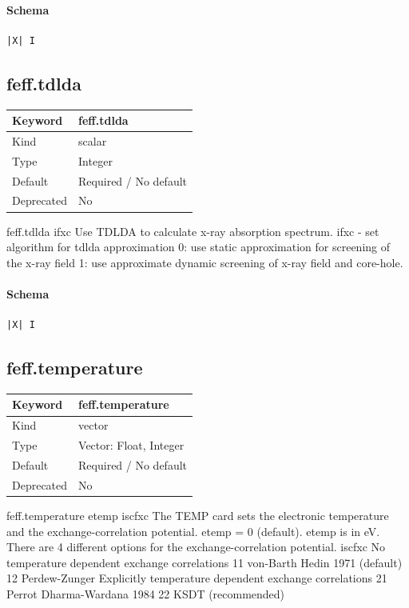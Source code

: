 \documentclass[11pt]{article}
\begin{document}
{{{{\paragraph{Schema}
\begin{Verbatim}
|X| I
\end{Verbatim}

\subsection{feff.tdlda}
\label{kw:feff-tdlda}
\begin{longtable}{|p{1.5in}|p{4.5in}|}
\hline
Keyword & feff.tdlda \\
\hline
Kind & scalar \\
\hline
Type & Integer \\
\hline
Default & Required / No default \\
\hline
Deprecated & No \\
\hline
\end{longtable}
 feff.tdlda{ ifxc }
 Use TDLDA to calculate x-ray absorption spectrum.
 ifxc - set algorithm for tdlda approximation
        0: use static approximation for screening of the x-ray field
        1: use approximate dynamic screening of x-ray field and core-hole.

\paragraph{Schema}
\begin{Verbatim}
|X| I
\end{Verbatim}

\subsection{feff.temperature}
\label{kw:feff-temperature}
\begin{longtable}{|p{1.5in}|p{4.5in}|}
\hline
Keyword & feff.temperature \\
\hline
Kind & vector \\
\hline
Type & Vector: Float, Integer \\
\hline
Default & Required / No default \\
\hline
Deprecated & No \\
\hline
\end{longtable}
 feff.temperature{ etemp iscfxc }
 The TEMP card sets the electronic temperature and the exchange-correlation potential. etemp
 = 0 (default). etemp is in eV. There are 4 different options for the exchange-correlation
 potential.
 iscfxc
    No temperature dependent exchange correlations
       11 von-Barth Hedin 1971 (default)
       12 Perdew-Zunger
    Explicitly temperature dependent exchange correlations
       21 Perrot Dharma-Wardana 1984
       22 KSDT (recommended)

}}}}
\end{document}
